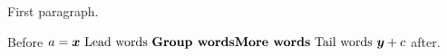 \documentclass{article}
\begin{document}
First paragraph.

Before $a = \boldsymbol{x $ Lead words {\bfseries Group words\endgraf More words} Tail words \lxmbf $ y} + c$ after.
\end{document}
